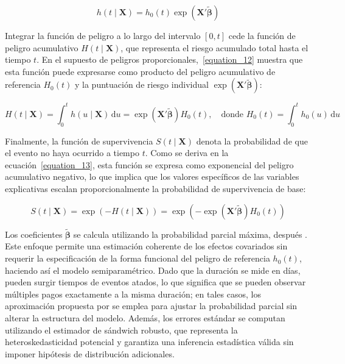 \documentclass[12pt]{article}
\providecommand{\textcite}{\citet}
\theoremstyle{definition}
\theoremstyle{remark}
\newcommand{\1}{\mathbf{1}}
\begin{document}
\begin{equation}
    h(t \mid \mathbf{X}) = h_0(t)\exp\left(\mathbf{X}'\tilde{\boldsymbol{\beta}}\right)
    \label{equation_11}
\end{equation}

Integrar la función de peligro a lo largo del intervalo $[0, t]$ cede la función de peligro acumulativo $H(t \mid \mathbf{X})$, que representa el riesgo acumulado total hasta el tiempo $t$. En el supuesto de peligros proporcionales,~\ref{equation_12} muestra que esta función puede expresarse como producto del peligro acumulativo de referencia $H_0(t)$ y la puntuación de riesgo individual $\exp(\mathbf{X}'\tilde{\boldsymbol{\beta}})$:

\begin{equation}
    H(t \mid \mathbf{X}) = \int_0^t h(u \mid \mathbf{X})\, \mathrm{d}u 
    = \exp\left(\mathbf{X}'\tilde{\boldsymbol{\beta}}\right) H_0(t), 
    \quad \text{donde } 
    H_0(t) = \int_0^t h_0(u)\, \mathrm{d}u
    \label{equation_12}
\end{equation}

Finalmente, la función de supervivencia $S(t \mid \mathbf{X})$ denota la probabilidad de que el evento no haya ocurrido a tiempo $t$. Como se deriva en la ecuación~\ref{equation_13}, esta función se expresa como exponencial del peligro acumulativo negativo, lo que implica que los valores específicos de las variables explicativas escalan proporcionalmente la probabilidad de supervivencia de base:

\begin{equation}
    S(t \mid \mathbf{X}) = \exp\left( -H(t \mid \mathbf{X}) \right) = \exp\left( - \exp\left(\mathbf{X}'\tilde{\boldsymbol{\beta}}\right) H_0(t) \right)
    \label{equation_13}
\end{equation}

Los coeficientes $\tilde{\boldsymbol{\beta}}$ se calcula utilizando la probabilidad parcial máxima, después \textcite{Cox1972}. Este enfoque permite una estimación coherente de los efectos covariados sin requerir la especificación de la forma funcional del peligro de referencia $h_0(t)$, haciendo así el modelo semiparamétrico. Dado que la duración se mide en días, pueden surgir tiempos de eventos atados, lo que significa que se pueden observar múltiples pagos exactamente a la misma duración; en tales casos, los aproximación propuesta por \textcite{Bradburn2003} se emplea para ajustar la probabilidad parcial sin alterar la estructura del modelo. Además, los errores estándar se computan utilizando el estimador de sándwich robusto, que representa la heteroskedasticidad potencial y garantiza una inferencia estadística válida sin imponer hipótesis de distribución adicionales.
\end{document}

